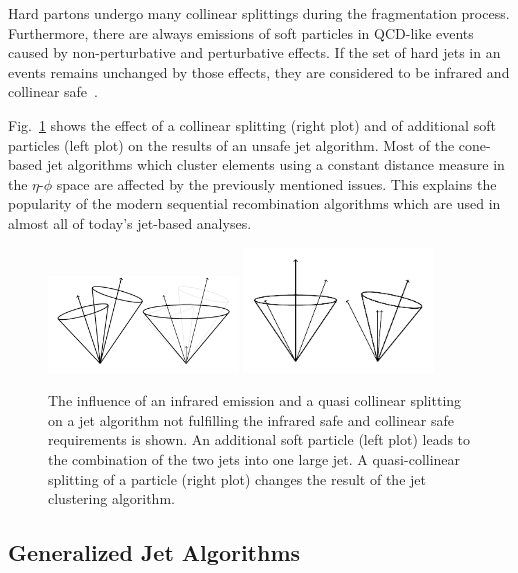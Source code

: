 Hard partons undergo many collinear splittings during the fragmentation process.
Furthermore, there are always emissions of soft particles in QCD-like events
caused by non-perturbative and perturbative effects. If the set of hard jets in an
events remains unchanged by those effects, they are considered to be infrared
and collinear safe~\cite{Salam:2009jx}.

Fig.~\ref{fig:infrared_safety} shows the effect of a collinear splitting (right
plot) and of additional soft particles (left plot) on the results of an unsafe
jet algorithm. Most of the cone-based jet algorithms which cluster elements
using a constant distance measure in the $\eta$-$\phi$ space are affected by the
previously mentioned issues. This explains the popularity of the modern sequential
recombination algorithms which are used in almost all of today's jet-based
analyses.

\begin{figure}[htbp]
    \centering
    \includegraphics[width=0.45\textwidth]{figures/drawings/infrared_safety/jetinfrared.pdf}\hfill
    \includegraphics[width=0.45\textwidth]{figures/drawings/infrared_safety/jetcollinear.pdf}
    \caption[Effect of infrared emissions and collinear splittings on jet
    algorithms]{The influence of an infrared emission and a quasi
        collinear splitting on a jet algorithm not fulfilling the infrared safe
        and collinear safe requirements is shown. An additional soft particle (left plot)
    leads to the combination of the two jets into one large jet. A
quasi-collinear splitting of a particle (right plot) changes the result of the
jet clustering algorithm.}
    \label{fig:infrared_safety}
\end{figure}

\subsection{Generalized \kt Jet Algorithms}


